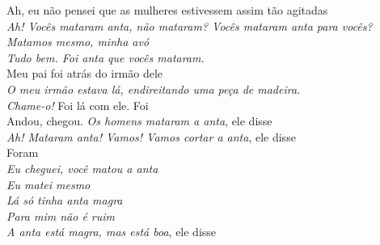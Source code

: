 \bigskip

\begin{linenumbers}\begingroup\raggedright
 
\noindent   Ah, eu não pensei que as mulheres estivessem assim tão agitadas\\
  \emph{Ah! Vocês mataram anta, não mataram? Vocês mataram anta para vocês?}\\
  \emph{Matamos mesmo, minha avó}\\
  \emph{Tudo bem. Foi anta que vocês mataram.}\\
  Meu pai foi atrás do irmão dele\\
  \emph{O meu irmão estava lá, endireitando uma peça de madeira.}\\
  \emph{Chame-o!} Foi lá com ele. Foi\\
  Andou, chegou. \emph{Os homens mataram a anta}, ele disse\\
  \emph{Ah! Mataram anta! Vamos! Vamos cortar a anta}, ele disse\\
  Foram\\
  \emph{Eu cheguei, você matou a anta}\\
  \emph{Eu matei mesmo}\\
  \emph{Lá só tinha anta magra}\\
  \emph{Para mim não é ruim}\\
  \emph{A anta está magra, mas está boa}, ele disse
 
\end{linenumbers}\endgroup

